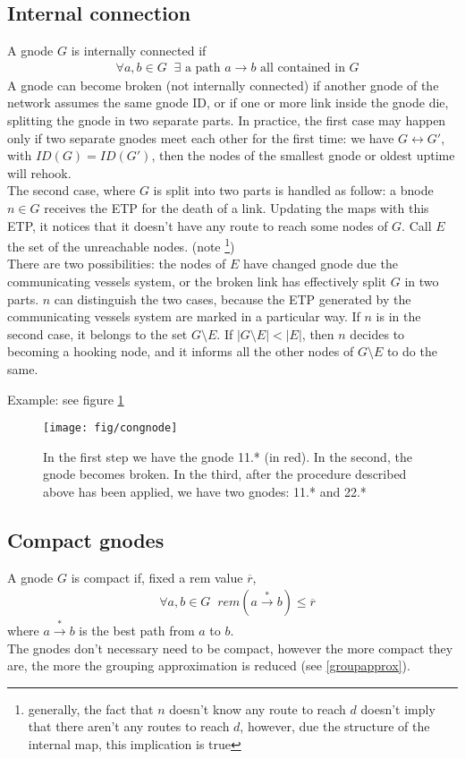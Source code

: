 \documentclass[a4paper]{article}
\newcommand{\T}[1]{\textrm{#1}}
\newcommand{\eal}[1]{{\begin{align*} #1 \end{align*}}}
\def\ove#1{{\overline{#1}}}
\def\-{{\setminus}}
\begin{document}
\subsection{Internal connection}
A gnode $G$ is internally connected if
\eal{&\forall a,b\in G\;\;\exists \T{ a path $a\rightarrow b$ all contained in $G$}}
A gnode can become broken (not internally connected) if another gnode of the
network assumes the same gnode ID, or if one or more link inside the gnode
die, splitting the gnode in two separate parts. In practice, the
first case may happen only if two separate gnodes meet each other for the
first time: we have $G \leftrightarrow G'$, with $ID(G)=ID(G')$, then the nodes 
of the smallest gnode or oldest uptime will rehook.\\
The second case, where $G$ is split into two parts is handled as follow:
a bnode $n\in G$ receives the ETP for the death of a link.
Updating the maps with this ETP, it notices that it doesn't
have any route to reach some nodes of $G$. Call $E$ the set of
the unreachable nodes. (note \footnote{generally, the fact that $n$ doesn't
know any route to reach $d$ doesn't imply that there aren't any routes to
reach $d$, however, due the structure of the internal map, this implication is true})\\
There are two possibilities: the nodes of $E$ have changed
gnode due the communicating vessels system, or the broken link
has effectively split $G$ in two parts.
$n$ can distinguish the two cases, because the ETP generated
by the communicating vessels system are marked in a particular way.
If $n$ is in the second case, it belongs to the set $G\-E$. If
$|G\-E| < |E|$, then $n$ decides to becoming a hooking node, and it informs
all the other nodes of $G\-E$ to do the same.

Example: see figure \ref{fig:congnode}
\begin{figure}[h]
	\begin{center}
		\texttt{[image: fig/congnode]}
	\end{center}
	\caption{In the first step we have the gnode 11.* (in red). In the
	second, the gnode becomes broken. In the third, after the procedure
	described above has been applied, we have two gnodes: 11.* and 22.*}
	\label{fig:congnode}
\end{figure}

\subsection{Compact gnodes}
A gnode $G$ is compact if, fixed a rem value $\ove r$, 
\eal{&\forall a,b\in G\;\;rem(a\stackrel{*}{\rightarrow} b)\le \ove r}
where $a\stackrel{*}{\rightarrow} b$ is the best path from $a$ to $b$.\\
The gnodes don't necessary need to be compact, however the more compact they
are, the more the grouping approximation is reduced (see \ref{groupapprox}).
\end{document}
